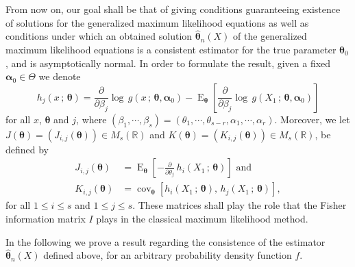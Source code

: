 \documentclass[10pt,a4paper,onecolumn]{article} %
\newcommand{\bs}{\boldsymbol}
\newcommand{\on}{\operatorname}
\begin{document}
From now on, our goal shall be that of giving conditions guaranteeing existence of solutions for the generalized maximum likelihood equations as well as conditions under which an obtained solution $\bs{\hat{\theta}}_n(X)$ of the generalized maximum likelihood equations is a consistent estimator for the true parameter $\bs{\theta}_0$, and is asymptotically normal. In order to formulate the result, given a fixed $\bs{\alpha}_0\in \Theta$ we denote
\begin{equation}\label{defh}
h_j(x\,;\,\bs{\theta}) = \frac{\partial}{\partial \beta_j}\log\, g \left(x\,;\,\bs{\theta},\bs{\alpha}_0\right) - \on{E}_{\bs{\theta}}\left[\frac{\partial}{\partial \beta_j}\log\, g \left(X_1\,;\,\bs{\theta},\bs{\alpha}_0\right)\right]
\end{equation}
for all $x$, $\bs{\theta}$ and $j$, where $(\beta_1,\cdots,\beta_s)=(\theta_1,\cdots,\theta_{s-r},\alpha_1,\cdots,\alpha_r)$. Moreover, we let $J(\bs{\theta})=\left(J_{i,j}(\bs{\theta})\right)\in M_{s}(\mathbb{R})$ and $K(\bs{\theta})=\left(K_{i,j}(\bs{\theta})\right)\in M_{s}(\mathbb{R})$, be defined by
 \begin{equation}\label{eqj}
 \begin{aligned}J_{i,j}(\bs{\theta})&=
 \on{E}_{\bs{\theta}} \left[-\frac{\partial}{\partial\theta_j}\, h_i(X_1\, ;\, \bs{\theta})\right]\mbox{ and}\\
 K_{i,j}(\bs{\theta}) &=  \on{cov}_{\bs{\theta}} \left[h_i(X_1\, ;\, \bs{\theta}),\,  h_j(X_1\, ;\, \bs{\theta})\right],
 \end{aligned}
 \end{equation}
 for all $1\leq i\leq s$ and $1\leq j\leq s$. These matrices shall play the role that the Fisher information matrix $I$ plays in the classical maximum likelihood method.

In the following we prove a result regarding the consistence of the estimator $\bs{\hat{\theta}}_n(X)$ defined above, for an arbitrary probability density function $f$.
\end{document}

